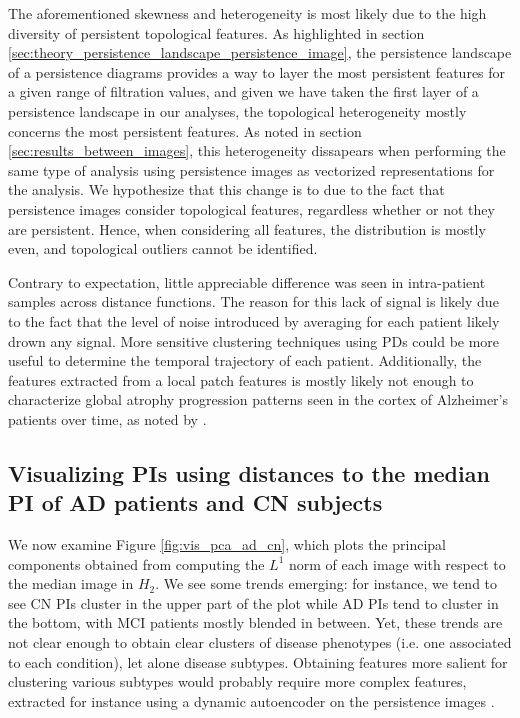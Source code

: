 \documentclass{article}
\begin{document}
The aforementioned skewness and heterogeneity is most likely due to the high diversity of persistent topological features. As highlighted in section \ref{sec:theory_persistence_landscape_persistence_image}, the persistence landscape of a persistence diagrams provides a way to layer the most persistent features for a given range of filtration values, and given we have taken the first layer of a persistence landscape in our analyses, the topological heterogeneity mostly concerns the most persistent features. As noted in section \ref{sec:results_between_images}, this heterogeneity dissapears when performing the same type of analysis using persistence images as vectorized representations for the analysis. We hypothesize that this change is to due to the fact that persistence images consider topological features, regardless whether or not they are persistent. Hence, when considering all features, the distribution is mostly even, and topological outliers cannot be identified.

Contrary to expectation, little appreciable difference was seen in intra-patient samples across distance functions. The reason for this lack of signal is likely due to the fact that the level of noise introduced by averaging for each patient likely drown any signal. More sensitive clustering techniques using PDs could be more useful to determine the temporal trajectory of each patient. Additionally, the features extracted from a local patch features is mostly likely not enough to characterize global atrophy progression patterns seen in the cortex of Alzheimer's patients over time, as noted by \citep{toniolo2018patterns}.

\subsection{Visualizing PIs using distances to the median PI of AD patients and CN subjects}

We now examine Figure \ref{fig:vis_pca_ad_cn}, which plots the principal components obtained from computing the $L^1$ norm of each image with respect to the median image in $H_2$. We see some trends emerging: for instance, we tend to see CN PIs cluster in the upper part of the plot while AD PIs tend to cluster in the bottom, with MCI patients mostly blended in between. Yet, these trends are not clear enough to obtain clear clusters of disease phenotypes (i.e. one associated to each condition), let alone disease subtypes. Obtaining features more salient for clustering various subtypes would probably require more complex features, extracted for instance using a dynamic autoencoder on the persistence images \citep{mrabah2019deep}.
\end{document}

